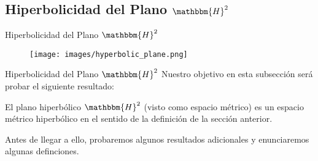 \documentclass[xcolor=dvipsnames]{beamer}
\theoremstyle{largebreak}
\newcommand{\bbm}[1]{\ensuremath{\mathbbm{#1}}}
\begin{document}
\subsection{Hiperbolicidad del Plano $\bbm{H}^2$}

\begin{frame}
    \begin{center}
        \Large Hiperbolicidad del Plano $\bbm{H}^2$
        
    \end{center}
    \begin{figure}
        \begin{center}
            \texttt{[image: images/hyperbolic\_plane.png]}
        \end{center}
    \end{figure}
\end{frame}

\begin{frame}{Hiperbolicidad del Plano $\bbm{H}^2$}
    Nuestro objetivo en esta subsección será probar el siguiente resultado:

    \begin{propo}
        El plano hiperbólico $\bbm{H}^2$ (visto como espacio métrico) es un espacio métrico hiperbólico en el sentido de la definición de la sección anterior.
    \end{propo}

    Antes de llegar a ello, probaremos algunos resultados adicionales y enunciaremos algunas definciones.
\end{frame}
\end{document}
